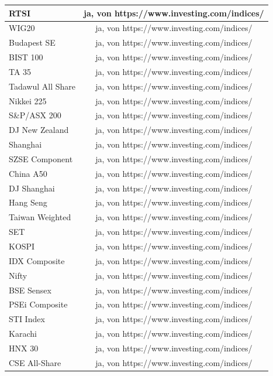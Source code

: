 \begin{longtable}[H]{|p{4cm}|p{}|p{}|}
RTSI	& \multicolumn{2}{c}{ja, von https://www.investing.com/indices/}\\ \hline	
WIG20		& \multicolumn{2}{c}{ja, von https://www.investing.com/indices/}\\ \hline
Budapest SE		& \multicolumn{2}{c}{ja, von https://www.investing.com/indices/}\\ \hline
BIST 100	& \multicolumn{2}{c}{ja, von https://www.investing.com/indices/}\\ \hline	
TA 35		& \multicolumn{2}{c}{ja, von https://www.investing.com/indices/}\\ \hline	 
Tadawul All Share	& \multicolumn{2}{c}{ja, von https://www.investing.com/indices/}\\ \hline
Nikkei 225		& \multicolumn{2}{c}{ja, von https://www.investing.com/indices/}\\ \hline
S\&P/ASX 200		& \multicolumn{2}{c}{ja, von https://www.investing.com/indices/}\\ \hline
DJ New Zealand		& \multicolumn{2}{c}{ja, von https://www.investing.com/indices/}\\ \hline
Shanghai	& \multicolumn{2}{c}{ja, von https://www.investing.com/indices/}\\ \hline
SZSE Component		& \multicolumn{2}{c}{ja, von https://www.investing.com/indices/}\\ \hline
China A50		& \multicolumn{2}{c}{ja, von https://www.investing.com/indices/}\\ \hline
DJ Shanghai	& \multicolumn{2}{c}{ja, von https://www.investing.com/indices/}\\ \hline
Hang Seng		& \multicolumn{2}{c}{ja, von https://www.investing.com/indices/}\\ \hline
Taiwan Weighted		& \multicolumn{2}{c}{ja, von https://www.investing.com/indices/}\\ \hline
SET		& \multicolumn{2}{c}{ja, von https://www.investing.com/indices/}\\ \hline
KOSPI	& \multicolumn{2}{c}{ja, von https://www.investing.com/indices/}\\ \hline
IDX Composite	& \multicolumn{2}{c}{ja, von https://www.investing.com/indices/}\\ \hline
Nifty 	& \multicolumn{2}{c}{ja, von https://www.investing.com/indices/}\\ \hline
BSE Sensex	& \multicolumn{2}{c}{ja, von https://www.investing.com/indices/}\\ \hline
PSEi Composite	& \multicolumn{2}{c}{ja, von https://www.investing.com/indices/}\\ \hline
STI Index	& \multicolumn{2}{c}{ja, von https://www.investing.com/indices/}\\ \hline
Karachi	& \multicolumn{2}{c}{ja, von https://www.investing.com/indices/}\\ \hline
HNX 30	& \multicolumn{2}{c}{ja, von https://www.investing.com/indices/}\\ \hline
CSE All-Share	& \multicolumn{2}{c}{ja, von https://www.investing.com/indices/}\\ \hline



\end{longtable}
